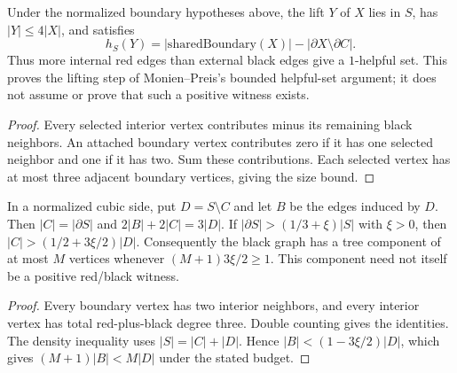 \begin{theorem}
  \label{thm:lowerbounds-algebraic-boundary-lift}
  \leanok
  Under the normalized boundary hypotheses above, the lift $Y$ of $X$
  lies in $S$, has $|Y|\le4|X|$, and satisfies
  \[
    h_S(Y)=|\mathrm{sharedBoundary}(X)|-
      |\partial X\setminus\partial C|.
  \]
  Thus more internal red edges than external black edges give a
  $1$-helpful set. This proves the lifting step of Monien--Preis's
  bounded helpful-set argument; it does not assume or prove that such
  a positive witness exists.
\end{theorem}
\begin{proof}
  \leanok
  Every selected interior vertex contributes minus its remaining black
  neighbors. An attached boundary vertex contributes zero if it has one
  selected neighbor and one if it has two. Sum these contributions.
  Each selected vertex has at most three adjacent boundary vertices,
  giving the size bound.
\end{proof}

\begin{theorem}
  \label{thm:lowerbounds-algebraic-red-density}
  \leanok
  In a normalized cubic side, put $D=S\setminus C$ and let $B$ be
  the edges induced by $D$. Then $|C|=|\partial S|$ and
  $2|B|+2|C|=3|D|$. If $|\partial S|>(1/3+\xi)|S|$ with $\xi>0$,
  then $|C|>(1/2+3\xi/2)|D|$. Consequently the black graph has a
  tree component of at most $M$ vertices whenever $(M+1)3\xi/2\ge1$.
  This component need not itself be a positive red/black witness.
\end{theorem}
\begin{proof}
  \leanok
  Every boundary vertex has two interior neighbors, and every interior
  vertex has total red-plus-black degree three. Double counting gives
  the identities. The density inequality uses $|S|=|C|+|D|$.
  Hence $|B|<(1-3\xi/2)|D|$, which gives
  $(M+1)|B|<M|D|$ under the stated budget.
\end{proof}

